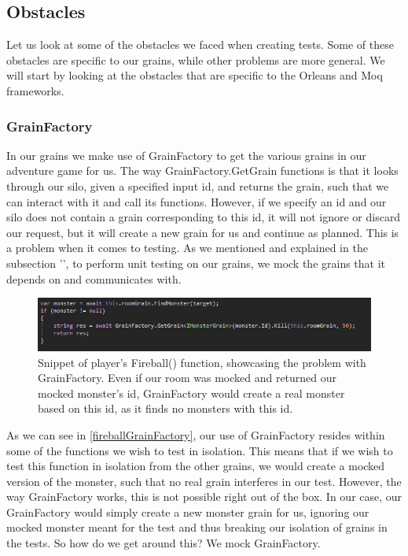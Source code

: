 \subsection{Obstacles}
Let us look at some of the obstacles we faced when creating tests. Some of these obstacles are specific to our grains, while other problems are more general. We will start by looking at the obstacles that are specific to the Orleans and Moq frameworks.
\subsubsection{GrainFactory} \label{GrainFactorySection}
In our grains we make use of GrainFactory to get the various grains in our adventure game for us. The way GrainFactory.GetGrain functions is that it looks through our silo, given a specified input id, and returns the grain, such that we can interact with it and call its functions. However, if we specify an id and our silo does not contain a grain corresponding to this id, it will not ignore or discard our request, but it will create a new grain for us and continue as planned.  This is a problem when it comes to testing. As we mentioned and explained in the subsection '', to perform unit testing on our grains, we mock the grains that it depends on and communicates with. 
\begin{figure}[h]
    \centering
    \includegraphics[width=\linewidth]{Materials/TestingTheory/FireballGrainFactory}
    \caption{Snippet of player's Fireball() function, showcasing the problem with GrainFactory. Even if our room was mocked and returned our mocked monster's id, GrainFactory would create a real monster based on this id, as it finds no monsters with this id.}
    \label{fireballGrainFactory}
\end{figure}
As we can see in \autoref{fireballGrainFactory}, our use of GrainFactory resides within some of the functions we wish to test in isolation. This means that if we wish to test this function in isolation from the other grains, we would create a mocked version of the monster, such that no real grain interferes in our test. However, the way GrainFactory works, this is not possible right out of the box. In our case, our GrainFactory would simply create a new monster grain for us, ignoring our mocked monster meant for the test and thus breaking our isolation of grains in the tests. So how do we get around this? We mock GrainFactory. \\

